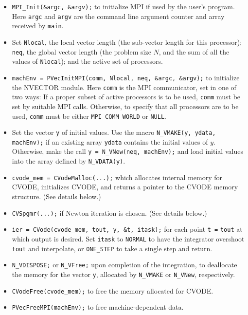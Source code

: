 \begin{itemize}

\item {\tt MPI\_Init(\&argc, \&argv);} to initialize MPI if used by
the user's program.  Here {\tt argc} and {\tt argv} are the command
line argument counter and array received by {\tt main}.

\item Set {\tt Nlocal}, the local vector length (the sub-vector
length for this processor); {\tt neq}, the global vector length (the
problem size $N$, and the sum of all the values of {\tt Nlocal});
and the active set of processors.

\item {\tt machEnv = PVecInitMPI(comm, Nlocal, neq, \&argc, \&argv);} to
initialize the NVECTOR module.  Here {\tt comm} is the MPI
communicator, set in one of two ways: If a proper subset of active
processors is to be used, {\tt comm} must be set by suitable MPI
calls.  Otherwise, to specify that all processors are to be used, 
{\tt comm} must be either {\tt MPI\_COMM\_WORLD} or {\tt NULL}.

\item Set the vector {\tt y} of initial values.  Use the macro
{\tt N\_VMAKE(y, ydata, machEnv);} if an existing array {\tt ydata} 
contains the initial values of $y$.  Otherwise, make the call
{\tt y = N\_VNew(neq, machEnv);} and load initial values into
the array defined by {\tt N\_VDATA(y)}.

\item {\tt cvode\_mem = CVodeMalloc(...);} which allocates internal
memory for CVODE, initializes CVODE, and returns a pointer to the
CVODE memory structure. (See details below.)

\item {\tt CVSpgmr(...);} if Newton iteration is chosen.
(See details below.)

\item {\tt ier = CVode(cvode\_mem, tout, y, \&t, itask);} for each
point {\tt t =} {\tt tout} at which output is desired.  Set {\tt itask}
to {\tt NORMAL} to have the integrator overshoot {\tt tout} and
interpolate, or {\tt ONE\_STEP} to take a single step and return.

\item {\tt N\_VDISPOSE;} or {\tt N\_VFree;} upon completion of the
integration, to deallocate the memory for the vector {\tt y}, allocated
by {\tt N\_VMAKE} or {\tt N\_VNew}, respectively.

\item {\tt CVodeFree(cvode\_mem);} to free the memory allocated for
CVODE.

\item {\tt PVecFreeMPI(machEnv);} to free machine-dependent data.

\end{itemize}

